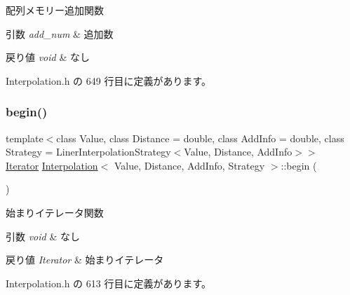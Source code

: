 配列メモリー追加関数 


\begin{DoxyParams}{引数}
{\em add\+\_\+num} & 追加数 \\
\hline
\end{DoxyParams}

\begin{DoxyRetVals}{戻り値}
{\em void} & なし \\
\hline
\end{DoxyRetVals}


 Interpolation.\+h の 649 行目に定義があります。

\mbox{\label{class_interpolation_a3d1c93d409027d14ca4c4373a81127dc}} 
\subsubsection{\texorpdfstring{begin()}{begin()}}
{\footnotesize\ttfamily template$<$class Value, class Distance = double, class Add\+Info = double, class Strategy = Liner\+Interpolation\+Strategy$<$\+Value, Distance, Add\+Info$>$$>$ \\
\mbox{\hyperlink{class_interpolation_a066eb9906faf7f1d56ba68d00c6be64a}{Iterator}} \mbox{\hyperlink{class_interpolation}{Interpolation}}$<$ Value, Distance, Add\+Info, Strategy $>$\+::begin (\begin{DoxyParamCaption}{ }\end{DoxyParamCaption})\hspace{0.3cm}{\ttfamily [inline]}}



始まりイテレータ関数 


\begin{DoxyParams}{引数}
{\em void} & なし \\
\hline
\end{DoxyParams}

\begin{DoxyRetVals}{戻り値}
{\em Iterator} & 始まりイテレータ \\
\hline
\end{DoxyRetVals}


 Interpolation.\+h の 613 行目に定義があります。

\mbox{\label{class_interpolation_a2058fcb997b38b8813e7de2e581a20f4}} 

